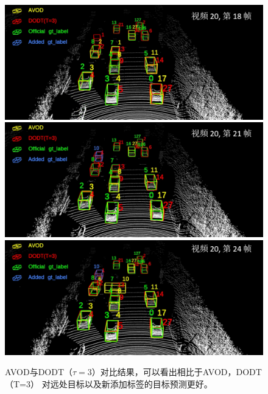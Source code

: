 \begin{figure}[t]
	\centering
	\includegraphics[width=\textwidth]{./imgs/viz_results/val/avod_dodt_01.png}\vspace{1pt}
	\includegraphics[width=\textwidth]{./imgs/viz_results/val/avod_dodt_02.png}\vspace{1pt}
	\includegraphics[width=\textwidth]{./imgs/viz_results/val/avod_dodt_03.png}
	\caption{AVOD与DODT（$\tau=3$）对比结果，可以看出相比于AVOD，DODT（T=3） 对远处目标以及新添加标签的目标预测更好。}
	\label{fig:avod_dodt}
\end{figure}


